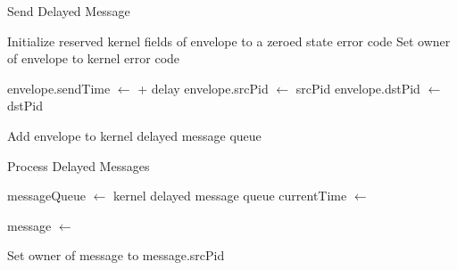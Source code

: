 \documentclass[12pt]{report}
\begin{document}
\begin{algorithm}
    \caption{Send Delayed Message}
    \label{code:send_delayed_message}
    \begin{algorithmic}[1]
            \State Initialize reserved kernel fields of envelope to a zeroed state
                \State \Return error code
            \EndIf
                \State Set owner of envelope to kernel
            \Else
                \State \Return error code
            \EndIf

            \State envelope.sendTime $\gets$  + delay
            \State envelope.srcPid $\gets$ srcPid
            \State envelope.dstPid $\gets$ dstPid

            \State Add envelope to kernel delayed message queue
        \EndFunction
    \end{algorithmic}
\end{algorithm}

\begin{algorithm}
    \caption{Process Delayed Messages}
    \label{code:process_delayed_messages}
    \begin{algorithmic}[1]
            \State messageQueue $\gets$ kernel delayed message queue
            \State currentTime $\gets$ 

                \State \Return
            \EndIf

            \Loop
                \State message $\gets$ 

                    \State \Return
                \EndIf

                \State {}
                \State Set owner of message to message.srcPid
                \State {}
            \EndLoop
        \EndFunction
    \end{algorithmic}
\end{algorithm}
\end{document}
